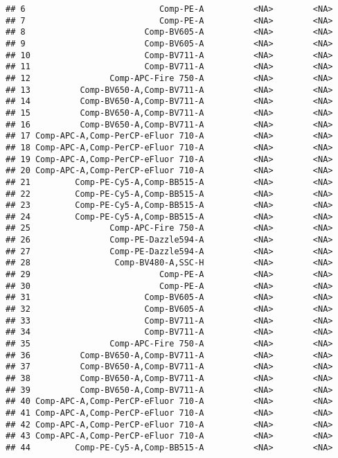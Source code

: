 \documentclass[]{book}
\begin{document}
\begin{verbatim}
## 6                           Comp-PE-A          <NA>        <NA>
## 7                           Comp-PE-A          <NA>        <NA>
## 8                        Comp-BV605-A          <NA>        <NA>
## 9                        Comp-BV605-A          <NA>        <NA>
## 10                       Comp-BV711-A          <NA>        <NA>
## 11                       Comp-BV711-A          <NA>        <NA>
## 12                Comp-APC-Fire 750-A          <NA>        <NA>
## 13          Comp-BV650-A,Comp-BV711-A          <NA>        <NA>
## 14          Comp-BV650-A,Comp-BV711-A          <NA>        <NA>
## 15          Comp-BV650-A,Comp-BV711-A          <NA>        <NA>
## 16          Comp-BV650-A,Comp-BV711-A          <NA>        <NA>
## 17 Comp-APC-A,Comp-PerCP-eFluor 710-A          <NA>        <NA>
## 18 Comp-APC-A,Comp-PerCP-eFluor 710-A          <NA>        <NA>
## 19 Comp-APC-A,Comp-PerCP-eFluor 710-A          <NA>        <NA>
## 20 Comp-APC-A,Comp-PerCP-eFluor 710-A          <NA>        <NA>
## 21         Comp-PE-Cy5-A,Comp-BB515-A          <NA>        <NA>
## 22         Comp-PE-Cy5-A,Comp-BB515-A          <NA>        <NA>
## 23         Comp-PE-Cy5-A,Comp-BB515-A          <NA>        <NA>
## 24         Comp-PE-Cy5-A,Comp-BB515-A          <NA>        <NA>
## 25                Comp-APC-Fire 750-A          <NA>        <NA>
## 26                Comp-PE-Dazzle594-A          <NA>        <NA>
## 27                Comp-PE-Dazzle594-A          <NA>        <NA>
## 28                 Comp-BV480-A,SSC-H          <NA>        <NA>
## 29                          Comp-PE-A          <NA>        <NA>
## 30                          Comp-PE-A          <NA>        <NA>
## 31                       Comp-BV605-A          <NA>        <NA>
## 32                       Comp-BV605-A          <NA>        <NA>
## 33                       Comp-BV711-A          <NA>        <NA>
## 34                       Comp-BV711-A          <NA>        <NA>
## 35                Comp-APC-Fire 750-A          <NA>        <NA>
## 36          Comp-BV650-A,Comp-BV711-A          <NA>        <NA>
## 37          Comp-BV650-A,Comp-BV711-A          <NA>        <NA>
## 38          Comp-BV650-A,Comp-BV711-A          <NA>        <NA>
## 39          Comp-BV650-A,Comp-BV711-A          <NA>        <NA>
## 40 Comp-APC-A,Comp-PerCP-eFluor 710-A          <NA>        <NA>
## 41 Comp-APC-A,Comp-PerCP-eFluor 710-A          <NA>        <NA>
## 42 Comp-APC-A,Comp-PerCP-eFluor 710-A          <NA>        <NA>
## 43 Comp-APC-A,Comp-PerCP-eFluor 710-A          <NA>        <NA>
## 44         Comp-PE-Cy5-A,Comp-BB515-A          <NA>        <NA>

\end{verbatim}
\end{document}
